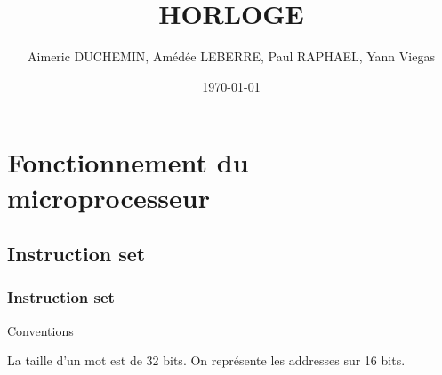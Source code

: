 \documentclass[12pt]{beamer}
\title{HORLOGE}
\author{Aimeric DUCHEMIN, Amédée LEBERRE, Paul RAPHAEL, Yann Viegas}
\institute{ENS Ulm}
\date{\today}
\begin{document}

\frame{\titlepage} %



\section{Fonctionnement du microprocesseur}
\subsection{Instruction set}

\begin{frame}
\frametitle{Instruction set}

\begin{prop}{Conventions}{}

    La taille d'un mot est de 32 bits.
    On représente les addresses sur 16 bits.\\
    
\end{prop}
\end{frame}
\end{document}

